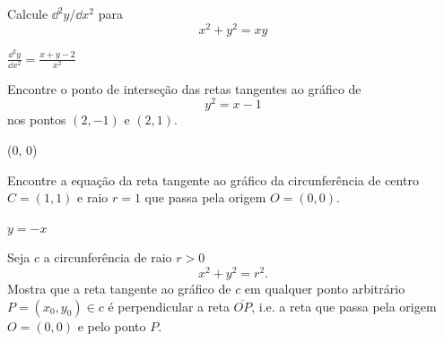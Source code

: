 \begin{exer}
  Calcule $\dd^2 y/\dd x^2$ para
  \begin{equation}
    x^2 + y^2 = xy
  \end{equation}
\end{exer}
\begin{resp}
  $\displaystyle \frac{\dd^2 y}{\dd x^2} = \frac{x + y - 2}{x^2}$
\end{resp}  

\begin{exer}
  Encontre o ponto de interseção das retas tangentes ao gráfico de
  \begin{equation}
    y^2  = x - 1
  \end{equation}
  nos pontos $(2, -1)$ e $(2, 1)$.
\end{exer}
\begin{resp}
  (0, 0)
\end{resp}

\begin{exer}
  Encontre a equação da reta tangente ao gráfico da circunferência de centro $C = (1,1)$ e raio $r=1$ que passa pela origem $O = (0,0)$.  
\end{exer}
\begin{resp}
  $y = -x$
\end{resp}

\begin{exer}
  Seja $c$ a circunferência de raio $r> 0$
  \begin{equation}
    x^2 + y^2 = r^2.
  \end{equation}
  Mostra que a reta tangente ao gráfico de $c$ em qualquer ponto arbitrário $P = (x_0, y_0)\in c$ é perpendicular a reta $\overline{OP}$, i.e. a reta que passa pela origem $O = (0, 0)$ e pelo ponto $P.$
\end{exer}
